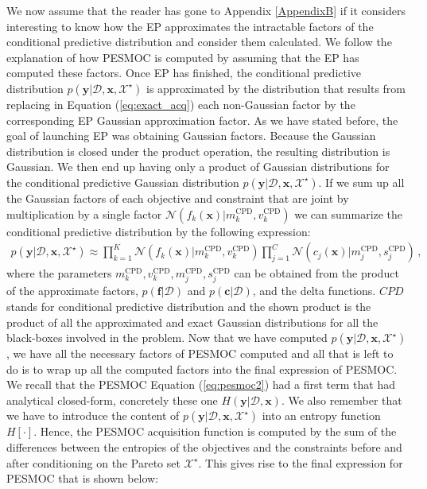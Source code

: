 We now assume that the reader has gone to Appendix \ref{AppendixB} if it considers interesting to know how the EP approximates the intractable factors of the conditional predictive distribution and consider them calculated. We follow the explanation of how PESMOC is computed by assuming that the EP has computed these factors. Once EP has finished, the conditional predictive distribution
$p(\textbf{y}|\mathcal{D},\textbf{x},\mathcal{X}^{\star})$  is approximated by the
distribution that results from replacing in Equation (\ref{eq:exact_acq})
each non-Gaussian factor by the corresponding EP Gaussian approximation factor. As we have stated before, the goal of launching EP was obtaining Gaussian factors. Because the Gaussian
distribution is closed under the product operation, the resulting distribution is Gaussian. We then end up having only a product of Gaussian distributions for the conditional predictive Gaussian distribution $p(\textbf{y}|\mathcal{D},\textbf{x},\mathcal{X}^{\star})$. If we sum up all the Gaussian factors of each objective and constraint that are joint by multiplication by a single factor $\mathcal{N}(f_k(\mathbf{x})|m_k^\text{CPD},v_k^\text{CPD})$ we can summarize the conditional predictive distribution by the following expression:
\begin{align}
p(\textbf{y}|\mathcal{D},\textbf{x},\mathcal{X}^{\star}) \approx 
        \prod_{k=1}^{K} \mathcal{N}(f_k(\mathbf{x})|m_k^\text{CPD},v_k^\text{CPD}) 
        \prod_{j=1}^{C} \mathcal{N}(c_j(\mathbf{x})|m_j^\text{CPD},s_j^\text{CPD})\,,
\end{align}
where the parameters $m_k^\text{CPD},v_k^\text{CPD},m_j^\text{CPD},s_j^\text{CPD}$ can be obtained from
the product of the approximate factors, $p(\mathbf{f}|\mathcal{D})$ and $p(\mathbf{c}|\mathcal{D})$, and
the delta functions. $CPD$ stands for conditional predictive distribution and the shown product is the product of all the approximated and exact Gaussian distributions for all the black-boxes involved in the problem. Now that we have computed $p(\textbf{y}|\mathcal{D},\textbf{x},\mathcal{X}^{\star})$, we have all the necessary factors of PESMOC computed and all that is left to do is to wrap up all the computed factors into the final expression of PESMOC. We recall that the PESMOC Equation (\ref{eq:pesmoc2}) had a first term that had analytical closed-form, concretely these one $H(\textbf{y}|\mathcal{D},\textbf{x})$. We also remember that we have to introduce the content of  $p(\textbf{y}|\mathcal{D},\textbf{x},\mathcal{X}^{\star})$ into an entropy function $H[\cdot]$. Hence, the PESMOC acquisition function is computed by the sum of the differences between the entropies of the objectives and the constraints before and after conditioning on the Pareto set $\mathcal{X}^{\star}$. This gives rise to the final expression for PESMOC that is shown below:
